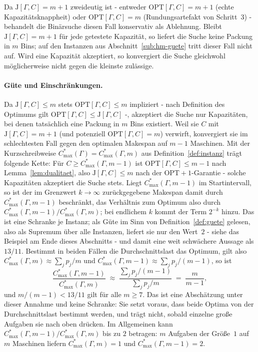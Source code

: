 Da $\mathrm{J}[\Gamma, C] = m+1$ zweideutig ist - entweder $\mathrm{OPT}[\Gamma, C] = m+1$ (echte Kapazitätsknappheit)
oder $\mathrm{OPT}[\Gamma, C] = m$ (Rundungsartefakt von Schritt~3) -
behandelt die Binärsuche diesen Fall konservativ als Ablehnung.
Bleibt $\mathrm{J}[\Gamma, C] = m+1$ für jede getestete Kapazität, so liefert die Suche keine
Packung in $m$ Bins; auf den Instanzen aus Abschnitt~\ref{sub:hm-guete} tritt dieser Fall
nicht auf.
Wird eine Kapazität akzeptiert, so konvergiert die Suche gleichwohl möglicherweise nicht
gegen die kleinste zulässige.

\paragraph{Güte und Einschränkungen.}
Da $\mathrm{J}[\Gamma, C] \le m$ stets $\mathrm{OPT}[\Gamma, C] \le m$ impliziert - nach
Definition des Optimums gilt $\mathrm{OPT}[\Gamma, C] \le \mathrm{J}[\Gamma, C]$ -,
akzeptiert die Suche nur Kapazitäten, bei denen tatsächlich eine Packung in $m$ Bins existiert.
Weil sie $C$ mit $\mathrm{J}[\Gamma, C] = m+1$ (und potenziell $\mathrm{OPT}[\Gamma, C] = m$) verwirft,
konvergiert sie im schlechtesten Fall gegen den optimalen Makespan auf $m-1$ Maschinen.
Mit der Kurzschreibweise $C^{*}_{\max}(\Gamma) = C^{*}_{\max}(\Gamma, m)$ aus
Definition~\ref{def:instanz} trägt folgende Kette:
Für $C \ge C^{*}_{\max}(\Gamma, m-1)$ ist $\mathrm{OPT}[\Gamma, C] \le m-1$ nach
Lemma~\ref{lem:dualitaet}, also $\mathrm{J}[\Gamma, C] \le m$ nach der $\mathrm{OPT}+1$-Garantie
- solche Kapazitäten akzeptiert die Suche stets.
Liegt $C^{*}_{\max}(\Gamma, m-1)$ im Startintervall, so ist der im Grenzwert $k \to \infty$
zurückgegebene Makespan damit durch $C^{*}_{\max}(\Gamma, m-1)$ beschränkt, das Verhältnis zum
Optimum also durch $C^{*}_{\max}(\Gamma, m-1)/C^{*}_{\max}(\Gamma, m)$; bei endlichem $k$ kommt
der Term $2^{-k}$ hinzu.
Das ist eine Schranke je Instanz; als Güte im Sinn von Definition~\ref{def:guete} gelesen, also
als Supremum über alle Instanzen, liefert sie nur den Wert~$2$ - siehe das Beispiel am Ende
dieses Abschnitts - und damit eine weit schwächere Aussage als $13/11$.
Bestimmt in beiden Fällen die Durchschnittslast das Optimum, gilt also
$C^{*}_{\max}(\Gamma, m) \approx \sum_j p_j/m$ und
$C^{*}_{\max}(\Gamma, m-1) \approx \sum_j p_j/(m-1)$, so ist
\[
  \frac{C^{*}_{\max}(\Gamma, m-1)}{C^{*}_{\max}(\Gamma, m)}
  \;\approx\; \frac{\sum_j p_j/(m-1)}{\sum_j p_j/m} \;=\; \frac{m}{m-1},
\]
und $m/(m-1) < 13/11$ gilt für alle $m \ge 7$.
Das ist eine Abschätzung unter dieser Annahme und keine Schranke: Sie setzt voraus, dass beide
Optima von der Durchschnittslast bestimmt werden, und trägt nicht, sobald einzelne große Aufgaben
sie nach oben drücken.
Im Allgemeinen kann $C^{*}_{\max}(\Gamma, m-1)/C^{*}_{\max}(\Gamma, m)$ bis zu $2$ betragen:
$m$ Aufgaben der Größe~$1$ auf $m$ Maschinen liefern $C^{*}_{\max}(\Gamma, m) = 1$ und $C^{*}_{\max}(\Gamma, m-1) = 2$.

